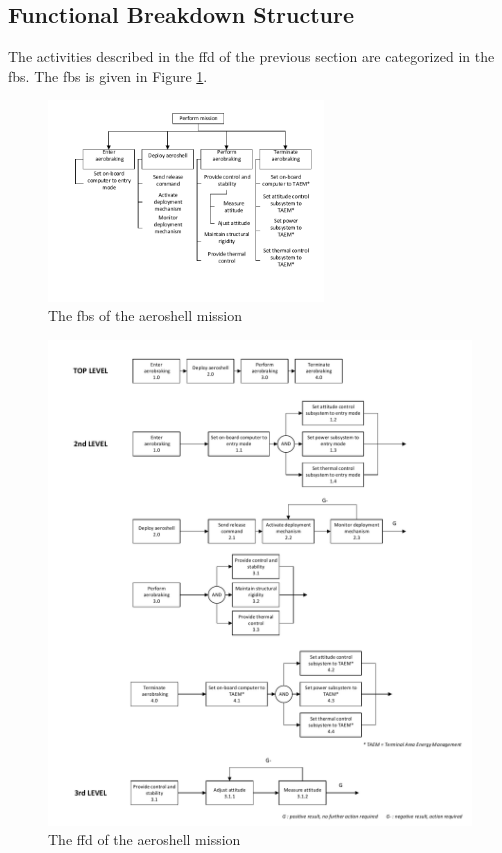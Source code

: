 \subsection{Functional Breakdown Structure} \label{sec:fbs}
The activities described in the \gls{ffd} of the previous section are categorized in the \gls{fbs}. The \gls{fbs} is given in Figure \ref{fig:fbd}.
\vspace{-10mm}
\begin{figure}[H]
\centering
\includegraphics[width = 0.65\textwidth]{Figure/FBS2.pdf}
\vspace{-10mm}
\caption{The \gls{fbs} of the aeroshell mission}
\label{fig:fbd}
\end{figure}

\begin{figure}[H]
\hspace{-10mm}                           
\includegraphics[width = 1.1\textwidth]{Figure/FFD.pdf}
\caption{The \gls{ffd} of the aeroshell mission}      
\label{fig:ffs}
\end{figure}